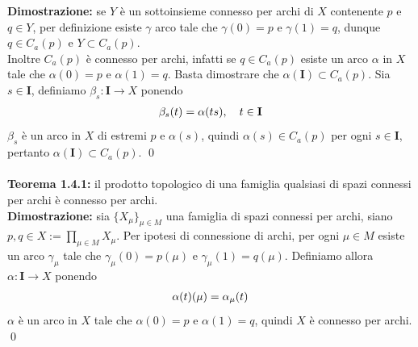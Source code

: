 \documentclass{article}
\begin{document}
\textbf{Dimostrazione:} se $Y$ è un sottoinsieme connesso per archi di $X$ contenente $p$ e $q \in Y$, per definizione esiste $\gamma$ arco tale che $\gamma(0) = p$ e $\gamma(1) = q$, dunque $q \in C_a(p)$ e $Y \subset C_a(p)$. \\
Inoltre $C_a(p)$ è connesso per archi, infatti se $q \in C_a(p)$ esiste un arco $\alpha$ in $X$ tale che $\alpha(0) = p$ e $\alpha(1) = q$. Basta dimostrare che $\alpha(\mathbf{I}) \subset C_a(p)$. Sia $s \in \mathbf{I}$, definiamo $\beta_s : \mathbf{I} \longrightarrow X$ ponendo
\begin{gather}
    \beta_s(t) = \alpha(ts), \quad t \in \mathbf{I} \notag
\end{gather}
$\beta_s$ è un arco in $X$ di estremi $p$ e $\alpha(s)$, quindi $\alpha(s) \in C_a(p)$ per ogni $s \in \mathbf{I}$, pertanto $\alpha(\mathbf{I}) \subset C_a(p)$. \qed \\ \\
\textbf{Teorema 1.4.1:} il prodotto topologico di una famiglia qualsiasi di spazi connessi per archi è connesso per archi. \\

\textbf{Dimostrazione:} sia $\{ X_\mu \}_{\mu \in M}$ una famiglia di spazi connessi per archi, siano $p, q \in X := \prod_{\mu \in M} X_\mu$. Per ipotesi di connessione di archi, per ogni $\mu \in M$ esiste un arco $\gamma_\mu$ tale che $\gamma_\mu(0) = p(\mu)$ e $\gamma_\mu(1) = q(\mu)$. Definiamo allora $\alpha : \mathbf{I} \longrightarrow X$ ponendo
\begin{gather}
    \alpha(t)(\mu) = \alpha_\mu(t) \notag
\end{gather}
$\alpha$ è un arco in $X$ tale che $\alpha(0) = p$ e $\alpha(1) = q$, quindi $X$ è connesso per archi. \qed

\newpage
\end{document}
